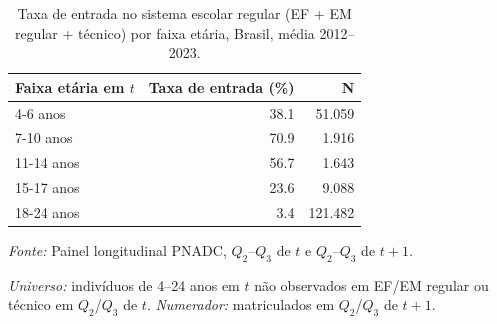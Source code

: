 \begin{table}[htbp]
\centering
\caption{Taxa de entrada no sistema escolar regular (EF + EM regular + t\'ecnico) por faixa et\'aria, Brasil, m\'edia 2012--2023.}
\label{tab:entrada_sistema}
\begin{threeparttable}
\small
\begin{tabular}{lrr}
\toprule
Faixa et\'aria em $t$ & Taxa de entrada (\%) & N \\
\midrule
4-6 anos & 38.1 & 51.059 \\
7-10 anos & 70.9 & 1.916 \\
11-14 anos & 56.7 & 1.643 \\
15-17 anos & 23.6 & 9.088 \\
18-24 anos & 3.4 & 121.482 \\
\bottomrule
\end{tabular}
\begin{tablenotes}\footnotesize
\item \textit{Fonte:} Painel longitudinal PNADC, $Q_2$--$Q_3$ de $t$ e $Q_2$--$Q_3$ de $t+1$.
\item \textit{Universo:} indiv\'iduos de 4--24 anos em $t$ n\~ao observados em EF/EM regular ou t\'ecnico em $Q_2$/$Q_3$ de $t$. \textit{Numerador:} matriculados em $Q_2$/$Q_3$ de $t+1$.
\end{tablenotes}
\end{threeparttable}
\end{table}
